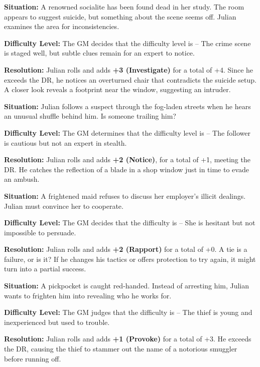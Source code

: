\begin{WyrdExample}
	\textbf{Situation:} A renowned socialite has been found dead in her study. The room appears to suggest suicide, but something about the scene seems off. Julian examines the area for inconsistencies.

	\noindent
	\textbf{Difficulty Level:} The GM decides that the difficulty level is \Formidable – The crime scene is staged well, but subtle clues remain for an expert to notice.

	\noindent
	\textbf{Resolution:} Julian rolls  and adds \textbf{+3 (Investigate)} for a total of +4. Since he exceeds the DR, he notices an overturned chair that contradicts the suicide setup. A closer look reveals a footprint near the window, suggesting an intruder.
\end{WyrdExample}


\begin{WyrdExample}
	\textbf{Situation:} Julian follows a suspect through the fog-laden streets when he hears an unusual shuffle behind him. Is someone trailing him?

	\noindent\textbf{Difficulty Level:} The GM determines that the difficulty level is \Difficult – The follower is cautious but not an expert in stealth.

	\noindent\textbf{Resolution:} Julian rolls  and adds  \textbf{+2 (Notice)}, for a total of +1, meeting the DR. He catches the reflection of a blade in a shop window just in time to evade an ambush.
\end{WyrdExample}


\begin{WyrdExample}
	\textbf{Situation:} A frightened maid refuses to discuss her employer’s illicit dealings. Julian must convince her to cooperate.

	\noindent\textbf{Difficulty Level:} The GM decides that the difficulty is \Challenging – She is hesitant but not impossible to persuade.

	\noindent\textbf{Resolution:} Julian rolls \FudgeRes{+---} and adds \textbf{+2 (Rapport)} for a total of +0. A tie is a failure, or is it? If he changes his tactics or offers protection to try again, it might turn into a partial success.
\end{WyrdExample}


\begin{WyrdExample}
	\textbf{Situation:} A pickpocket is caught red-handed. Instead of arresting him, Julian wants to frighten him into revealing who he works for.

	\noindent\textbf{Difficulty Level:} The GM judges that the difficulty is \Basic – The thief is young and inexperienced but used to trouble.

	\noindent\textbf{Resolution:} Julian rolls  and adds \textbf{+1 (Provoke)} for a total of +3. He exceeds the DR, causing the thief to stammer out the name of a notorious smuggler before running off.
\end{WyrdExample}


